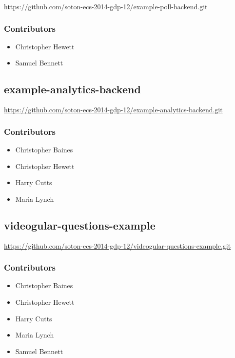 \url{https://github.com/soton-ecs-2014-gdp-12/example-poll-backend.git}

\subsubsection{Contributors}
\begin{itemize}
  \item Christopher Hewett
  \item Samuel Bennett
\end{itemize}

\subsection{example-analytics-backend}
\label{Section:Repo_example_analytics_backend}

\url{https://github.com/soton-ecs-2014-gdp-12/example-analytics-backend.git}

\subsubsection{Contributors}
\begin{itemize}
  \item Christopher Baines
  \item Christopher Hewett
  \item Harry Cutts
  \item Maria Lynch
\end{itemize}

\subsection{videogular-questions-example}
\label{Section:Repo_videogular-questions-example}

\url{https://github.com/soton-ecs-2014-gdp-12/videogular-questions-example.git}

\subsubsection{Contributors}
\begin{itemize}
  \item Christopher Baines
  \item Christopher Hewett
  \item Harry Cutts
  \item Maria Lynch
  \item Samuel Bennett
\end{itemize}

